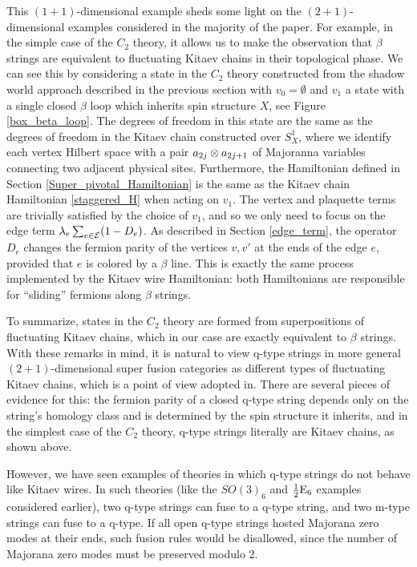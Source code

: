 This $(1+1)$-dimensional example sheds some light on the $(2+1)$-dimensional examples 
considered in the majority of the paper. 
For example, in the simple case of the $C_2$ theory, it allows us to make the observation that
$\beta$ strings are equivalent to fluctuating Kitaev chains in their topological phase. 
We can see this by considering a state in the $C_2$ theory constructed 
from the shadow world approach described in the previous section with $v_0 = \emptyset$ and $v_1$ a state 
with a single closed $\beta$ loop which inherits spin structure $X$, see Figure \ref{box_beta_loop}.
The degrees of freedom in this state are the same as 
the degrees of freedom in the Kitaev chain constructed over $S^1_X$, 
where we identify each vertex Hilbert space with a pair $a_{2j}\otimes a_{2j+1}$ of Majoranna
variables connecting two adjacent physical sites. 
Furthermore, the Hamiltonian defined in Section \ref{Super_pivotal_Hamiltonian} is the same as the Kitaev 
chain Hamiltonian \eqref{staggered_H} when acting on $v_1$. 
The vertex and plaquette terms are trivially satisfied by the choice of $v_1$, and so we only need to focus 
on the edge term $\lambda_e \sum_{e\in \mathcal{E}} (1-D_e)$. As described in Section \ref{edge_term}, 
the operator $D_e$ changes the fermion parity of the vertices $v,v'$ at the ends of the edge $e$, provided
that $e$ is colored by a $\beta$ line. 
This is exactly the same process implemented by the Kitaev wire Hamiltonian: both Hamiltonians
 are responsible for ``sliding'' fermions along $\beta$ strings.  

To summarize, states in the $C_2$ theory are formed from superpositions of fluctuating Kitaev chains, which in our case are exactly equivalent to $\beta$ strings. 
With these remarks in mind, it 
is natural to view q-type strings in more general $(2+1)$-dimensional super fusion categories 
as different types of fluctuating Kitaev chains, which is a point of view adopted in\cite{tarantino2016,ware2016,kapustin2017}. 
There are several pieces of evidence for this: the fermion parity of a closed q-type string 
depends only on the string's homology class and is determined by the spin structure it inherits, 
and in the simplest case of the $C_2$ theory, q-type strings literally are Kitaev chains, as shown 
above. 

However, we have seen examples of theories in which q-type strings do not behave like Kitaev wires.
In such theories (like the $SO(3)_6$ and $\frac{1}{2}\text{E}_6$ examples considered earlier), two q-type
strings can fuse to a q-type string, and two m-type strings can fuse to a q-type. 
If all open q-type strings hosted Majorana zero modes at their ends, such fusion rules would 
be disallowed, since the number of Majorana zero modes must be preserved modulo 2.


 